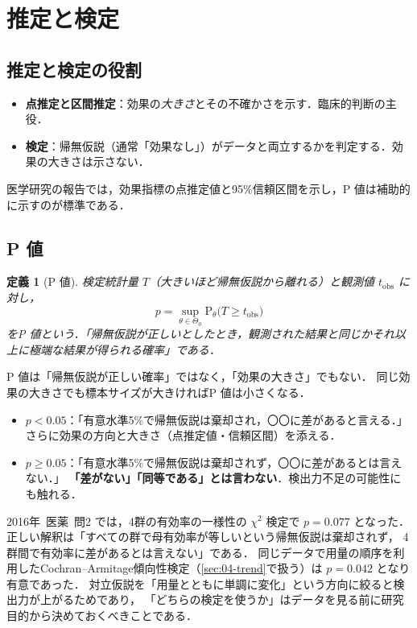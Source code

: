 \documentclass[a4paper,11pt,openany]{ltjsbook}
\newtheorem{teigi}{定義}[chapter]
\newcommand{\tagbox}[2]{\tcbox[on line,boxsep=0.5pt,left=2pt,right=2pt,top=0.5pt,bottom=0.5pt,
  colframe=#1,colback=#1!10,boxrule=0.4pt,arc=1pt]{\scriptsize\bfseries\textcolor{#1}{#2}}}
\newcommand{\Youchui}{\tagbox{bkpurple}{要注意}}
\newcommand{\kakomon}[2]{\mbox{#1年 医薬 問#2}}
\newcommand{\Prob}{\mathrm{P}}
\begin{document}
\section{推定と検定}\label{sec:01-inference}
\subsection{推定と検定の役割}
\begin{itemize}
\item \textbf{点推定と区間推定}：効果の\emph{大きさ}とその不確かさを示す．臨床的判断の主役．
\item \textbf{検定}：帰無仮説（通常「効果なし」）がデータと両立するかを判定する．効果の大きさは示さない．
\end{itemize}
医学研究の報告では，効果指標の点推定値と95\%信頼区間を示し，P 値は補助的に示すのが標準である．

\subsection{P 値}\label{subsec:01-pvalue}
\begin{teigi}[P 値]\label{def:01-pvalue}
検定統計量 $T$（大きいほど帰無仮説から離れる）と観測値 $t_{\mathrm{obs}}$ に対し，
\[
p=\sup_{\theta\in\Theta_0}\Prob_\theta\bigl(T\ge t_{\mathrm{obs}}\bigr)
\]
をP 値という．「帰無仮説が正しいとしたとき，観測された結果と同じかそれ以上に極端な結果が得られる確率」である．
\end{teigi}
\Youchui P 値は「帰無仮説が正しい確率」ではなく，「効果の大きさ」でもない．
同じ効果の大きさでも標本サイズが大きければP 値は小さくなる．

\begin{pointbox}
\begin{itemize}
\item $p<0.05$：「有意水準5\%で帰無仮説は棄却され，〇〇に差があると言える．」
      さらに効果の方向と大きさ（点推定値・信頼区間）を添える．
\item $p\ge 0.05$：「有意水準5\%で帰無仮説は棄却されず，〇〇に差があるとは言えない．」
      \textbf{「差がない」「同等である」とは言わない}．検出力不足の可能性にも触れる．
\end{itemize}
\end{pointbox}

\kakomon{2016}{2} では，4群の有効率の一様性の $\chi^2$ 検定で $p=0.077$ となった．
正しい解釈は「すべての群で母有効率が等しいという帰無仮説は棄却されず，
4群間で有効率に差があるとは言えない」である．
同じデータで用量の順序を利用したCochran--Armitage傾向性検定（\cref{sec:04-trend}で扱う）は $p=0.042$ となり有意であった．
対立仮説を「用量とともに単調に変化」という方向に絞ると検出力が上がるためであり，
「どちらの検定を使うか」はデータを見る前に研究目的から決めておくべきことである．
\end{document}
